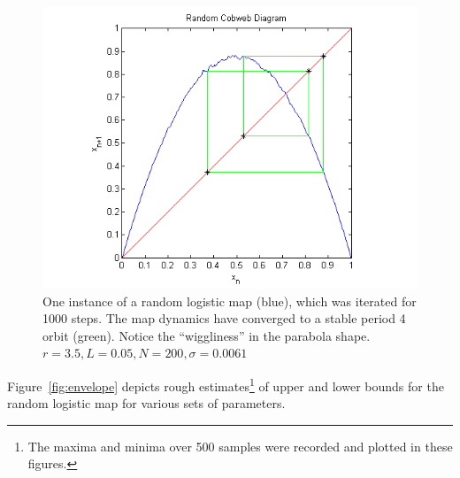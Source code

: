 \begin{figure}[!h]
\caption[Random logistic map, stable orbit]{One instance of a random
  logistic map (blue), which was iterated for 1000 steps. The map
  dynamics have converged to a stable period 4 orbit (green). Notice the
  ``wiggliness'' in the parabola shape. $r=3.5,L=0.05,N=200,\sigma=0.0061$}\label{fig:rlogstable}
	\begin{center}
		\includegraphics[scale=0.7]{figs/rand_cobweb.png}
	\end{center}
\end{figure}
 Figure~\ref{fig:envelope} depicts rough estimates\footnote{The
  maxima and minima over 500 samples were recorded and plotted in
  these figures.} of upper and lower bounds for the random logistic
map for various sets of parameters. 
